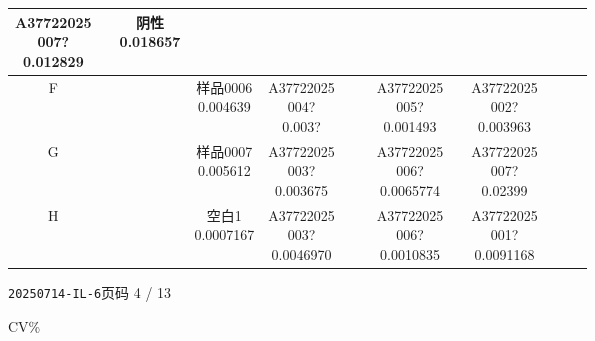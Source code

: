 \documentclass[UTF8,10pt,a4paper,fontset=fandol]{ctexart}
\begin{document}
{\begin{tabular}{c|*{12}{c|}}
\shortstack{A37722025\\007?\\0.012829} & &
\shortstack{阴性\\0.018657} & \\ \hline
F & & &
\shortstack{样品0006\\0.004639} &
\shortstack{A37722025\\004?\\0.003?} & & &
\shortstack{A37722025\\005?\\0.001493} & &
\shortstack{A37722025\\002?\\0.003963} & & & \\ \hline
G & & &
\shortstack{样品0007\\0.005612} &
\shortstack{A37722025\\003?\\0.003675} & & &
\shortstack{A37722025\\006?\\0.0065774} & &
\shortstack{A37722025\\007?\\0.02399} & & & \\ \hline
H & & &
\shortstack{空白1\\0.0007167} &
\shortstack{A37722025\\003?\\0.0046970} & & &
\shortstack{A37722025\\006?\\0.0010835} & &
\shortstack{A37722025\\001?\\0.0091168} & & & \\ \hline
\end{tabular}%
}


\newpage

\noindent
\texttt{20250714-IL-6}\hfill 页码 4 / 13

\medskip
\noindent
CV\%
\end{document}
